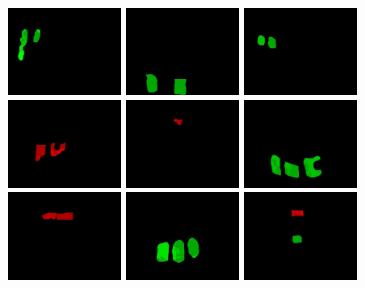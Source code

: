 \documentclass[a4paper,10pt]{report}
\begin{document}
\begin{figure}[htbp]
  \includegraphics[width=3cm]{piece(9).jpg}
  \includegraphics[width=3cm]{piece(10).jpg}
  \includegraphics[width=3cm]{piece(11).jpg}
  \includegraphics[width=3cm]{piece(12).jpg}
  \includegraphics[width=3cm]{piece(13).jpg}
  \includegraphics[width=3cm]{piece(14).jpg}
  \includegraphics[width=3cm]{piece(15).jpg}
  \includegraphics[width=3cm]{piece(16).jpg}
  \includegraphics[width=3cm]{piece(17).jpg}
\end{figure}
\end{document}
